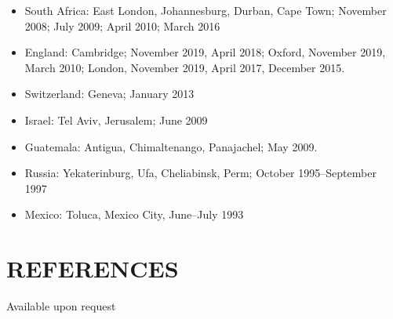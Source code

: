 \documentclass[10pt]{article}
\begin{document}
\begin{itemize}
\begin{itemize}
    \item South Africa: East London, Johannesburg, Durban, Cape Town; November 2008; July 2009; April 2010; March 2016
    \item England: Cambridge; November 2019, April 2018; Oxford, November 2019, March 2010; London, November 2019, April 2017, December 2015. 
    \item Switzerland: Geneva; January 2013
    \item Israel: Tel Aviv, Jerusalem; June 2009
    \item Guatemala: Antigua, Chimaltenango, Panajachel; May 2009.
    \item Russia: Yekaterinburg, Ufa, Cheliabinsk, Perm; October 1995--September 1997
    \item Mexico: Toluca, Mexico City, June--July 1993
    \end{itemize}
\end{itemize}


\section*{REFERENCES}

Available upon request
\end{document}
